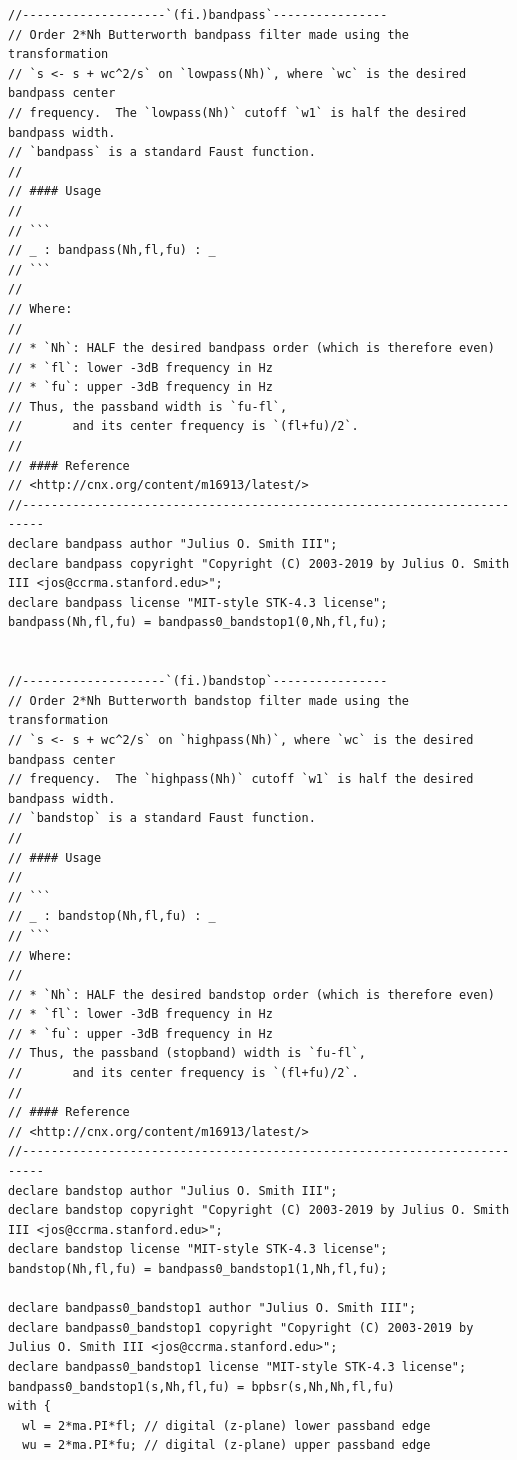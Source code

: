 \documentclass{article}
\begin{document}
\begin{lstlisting}[caption=\texttt{filters.lib}]
//--------------------`(fi.)bandpass`----------------
// Order 2*Nh Butterworth bandpass filter made using the transformation
// `s <- s + wc^2/s` on `lowpass(Nh)`, where `wc` is the desired bandpass center
// frequency.  The `lowpass(Nh)` cutoff `w1` is half the desired bandpass width.
// `bandpass` is a standard Faust function.
//
// #### Usage
//
// ```
// _ : bandpass(Nh,fl,fu) : _
// ```
//
// Where:
//
// * `Nh`: HALF the desired bandpass order (which is therefore even)
// * `fl`: lower -3dB frequency in Hz
// * `fu`: upper -3dB frequency in Hz
// Thus, the passband width is `fu-fl`,
//       and its center frequency is `(fl+fu)/2`.
//
// #### Reference
// <http://cnx.org/content/m16913/latest/>
//-------------------------------------------------------------------------
declare bandpass author "Julius O. Smith III";
declare bandpass copyright "Copyright (C) 2003-2019 by Julius O. Smith III <jos@ccrma.stanford.edu>";
declare bandpass license "MIT-style STK-4.3 license";
bandpass(Nh,fl,fu) = bandpass0_bandstop1(0,Nh,fl,fu);


//--------------------`(fi.)bandstop`----------------
// Order 2*Nh Butterworth bandstop filter made using the transformation
// `s <- s + wc^2/s` on `highpass(Nh)`, where `wc` is the desired bandpass center
// frequency.  The `highpass(Nh)` cutoff `w1` is half the desired bandpass width.
// `bandstop` is a standard Faust function.
//
// #### Usage
//
// ```
// _ : bandstop(Nh,fl,fu) : _
// ```
// Where:
//
// * `Nh`: HALF the desired bandstop order (which is therefore even)
// * `fl`: lower -3dB frequency in Hz
// * `fu`: upper -3dB frequency in Hz
// Thus, the passband (stopband) width is `fu-fl`,
//       and its center frequency is `(fl+fu)/2`.
//
// #### Reference
// <http://cnx.org/content/m16913/latest/>
//-------------------------------------------------------------------------
declare bandstop author "Julius O. Smith III";
declare bandstop copyright "Copyright (C) 2003-2019 by Julius O. Smith III <jos@ccrma.stanford.edu>";
declare bandstop license "MIT-style STK-4.3 license";
bandstop(Nh,fl,fu) = bandpass0_bandstop1(1,Nh,fl,fu);

declare bandpass0_bandstop1 author "Julius O. Smith III";
declare bandpass0_bandstop1 copyright "Copyright (C) 2003-2019 by Julius O. Smith III <jos@ccrma.stanford.edu>";
declare bandpass0_bandstop1 license "MIT-style STK-4.3 license";
bandpass0_bandstop1(s,Nh,fl,fu) = bpbsr(s,Nh,Nh,fl,fu)
with {
  wl = 2*ma.PI*fl; // digital (z-plane) lower passband edge
  wu = 2*ma.PI*fu; // digital (z-plane) upper passband edge


\end{lstlisting}
\end{document}
